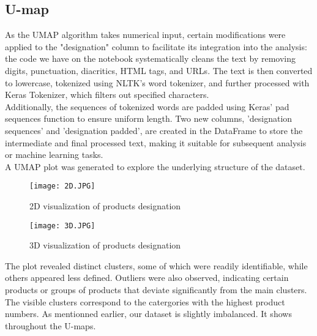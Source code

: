 \newpage
\subsection{U-map}

As the UMAP algorithm takes numerical input, certain modifications were applied to the "designation" column to facilitate its integration into the analysis:  the code we have on the notebook systematically cleans the text by removing digits, punctuation, diacritics, HTML tags, and URLs. The text is then converted to lowercase, tokenized using NLTK's word tokenizer, and further processed with Keras Tokenizer, which filters out specified characters.\\ Additionally, the sequences of tokenized words are padded using Keras' pad sequences function to ensure uniform length. Two new columns, 'designation sequences' and 'designation padded', are created in the DataFrame to store the intermediate and final processed text, making it suitable for subsequent analysis or machine learning tasks. \\A UMAP plot was generated to explore the underlying structure of the dataset.\\


\begin{figure}[h]
	\centering  
	\texttt{[image: 2D.JPG]}
	\caption{2D visualization of products designation}
	\label{fig:label}
\end{figure}

\newpage

\begin{figure}[h]
	\centering  
	\texttt{[image: 3D.JPG]}
	\caption{3D visualization of products designation}
	\label{fig:label}
\end{figure}

The plot revealed distinct clusters, some of which were readily identifiable, while others appeared less defined. Outliers were also observed, indicating certain products or groups of products that deviate significantly from the main clusters. \\ The visible clusters correspond to the catergories with the highest product numbers. As mentionned earlier, our dataset is slightly imbalanced. It shows throughout the U-maps. 
